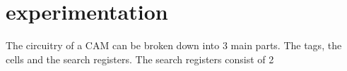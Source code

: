 \section{experimentation}
The circuitry of a CAM can be broken down into 3 main parts. The tags, the cells and the search registers. 
The search registers consist of 2
